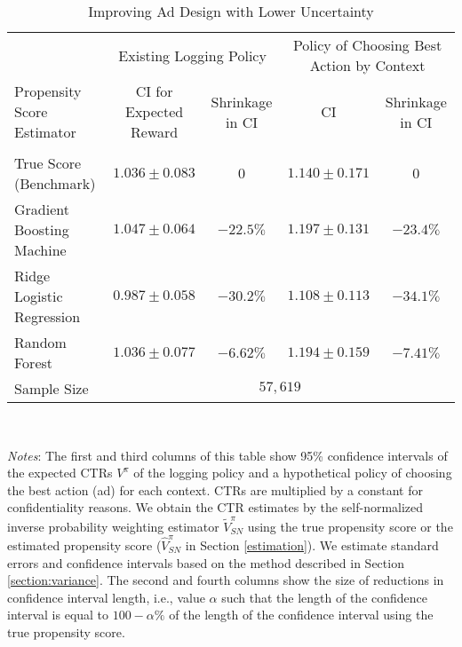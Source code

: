 \documentclass[letterpaper]{article} \usepackage{aaai19}  \usepackage{times}  \usepackage{helvet}  \usepackage{courier}  \usepackage{url}  \usepackage{graphicx}  \frenchspacing  \usepackage{comment}
\newcommand{\citep}{\cite}
\begin{document}
\begin{table*}[htb]\centering
	\begin{threeparttable}
		\begin{tabular}{l |cc | cc}\hline
&\multicolumn{2}{c|}{Existing Logging Policy} & \multicolumn{2}{c}{Policy of Choosing Best Action by Context}\\[0.2cm]
			Propensity Score Estimator& CI for Expected Reward & Shrinkage in CI & CI & Shrinkage in CI \\ \hline
			&&&& \\[-0.3em]
			True Score (Benchmark) & $1.036\pm 0.083$& $0$ & $1.140\pm 0.171$ & $0$ \\[0.2cm] 
			Gradient Boosting Machine & $1.047\pm 0.064$& $-22.5\%$ & $1.197\pm 0.131$ & $-23.4\%$\\[0.2cm]
			Ridge Logistic Regression & $0.987\pm 0.058$& $-30.2\%$ & $1.108\pm 0.113$& $-34.1\%$\\[0.2cm]
			Random Forest & $1.036\pm 0.077$& $-6.62\%$ & $1.194\pm 0.159$ & $-7.41\%$\\[0.2cm] \hline
			Sample Size & \multicolumn{4}{c}{$57,619$}\\\hline
		\end{tabular}
		\caption{Improving Ad Design with Lower Uncertainty}\label{table}\par
		~\par
		\fontsize{9.0pt}{10.0pt}\selectfont \textit{Notes}: The first and third columns of this table show 95\% confidence intervals of the expected CTRs $V^{\pi}$ of the logging policy and a hypothetical policy of choosing the best action (ad) for each context. 
			CTRs are multiplied by a constant for confidentiality reasons. 
			We obtain the CTR estimates by the self-normalized inverse probability weighting estimator $\tilde V^\pi_{SN}$ using the true propensity score \citep{Swaminathan2015b} or the estimated propensity score ($\hat V^{\pi}_{SN}$ in Section \ref{estimation}). 
			We estimate standard errors and confidence intervals based on the method described in Section \ref{section:variance}. 
			The second and fourth columns show the size of reductions in confidence interval length, i.e., value $\alpha$ such that the length of the confidence interval is equal to $100-\alpha\%$ of the length of the confidence interval using the true propensity score.\\
	\end{threeparttable}
\end{table*}
\end{document}
